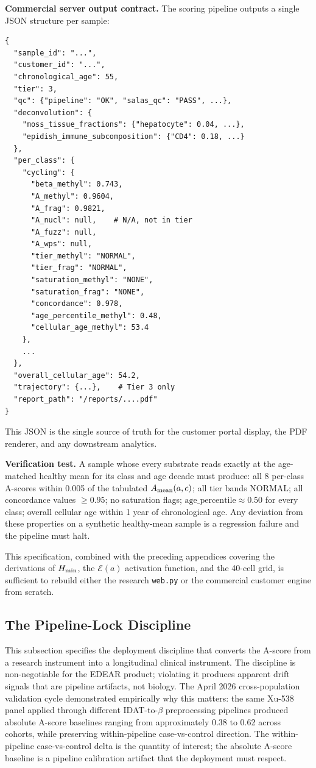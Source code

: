 \documentclass[12pt,a4paper]{article}
\begin{document}
\textbf{Commercial server output contract.} The scoring pipeline
outputs a single JSON structure per sample:

\begin{verbatim}
{
  "sample_id": "...",
  "customer_id": "...",
  "chronological_age": 55,
  "tier": 3,
  "qc": {"pipeline": "OK", "salas_qc": "PASS", ...},
  "deconvolution": {
    "moss_tissue_fractions": {"hepatocyte": 0.04, ...},
    "epidish_immune_subcomposition": {"CD4": 0.18, ...}
  },
  "per_class": {
    "cycling": {
      "beta_methyl": 0.743,
      "A_methyl": 0.9604,
      "A_frag": 0.9821,
      "A_nucl": null,    # N/A, not in tier
      "A_fuzz": null,
      "A_wps": null,
      "tier_methyl": "NORMAL",
      "tier_frag": "NORMAL",
      "saturation_methyl": "NONE",
      "saturation_frag": "NONE",
      "concordance": 0.978,
      "age_percentile_methyl": 0.48,
      "cellular_age_methyl": 53.4
    },
    ...
  },
  "overall_cellular_age": 54.2,
  "trajectory": {...},    # Tier 3 only
  "report_path": "/reports/....pdf"
}
\end{verbatim}

This JSON is the single source of truth for the customer portal
display, the PDF renderer, and any downstream analytics.

\textbf{Verification test.} A sample whose every substrate reads
exactly at the age-matched healthy mean for its class and age decade
must produce: all 8 per-class A-scores within 0.005 of the tabulated
$A_{\rm mean}(a,c)$; all tier bands NORMAL; all concordance values
$\geq 0.95$; no saturation flags; $\mathrm{age\_percentile} \approx 0.50$
for every class; overall cellular age within 1 year of chronological
age. Any deviation from these properties on a synthetic healthy-mean
sample is a regression failure and the pipeline must halt.

This specification, combined with the preceding appendices covering
the derivations of $H_{\rm min}$, the $\mathcal{E}(a)$ activation
function, and the 40-cell grid, is sufficient to rebuild either the
research \texttt{web.py} or the commercial customer engine from
scratch.

\subsection{The Pipeline-Lock Discipline}
\label{subsec:pipeline_lock}

This subsection specifies the deployment discipline that converts the
A-score from a research instrument into a longitudinal clinical
instrument. The discipline is non-negotiable for the EDEAR product;
violating it produces apparent drift signals that are pipeline
artifacts, not biology. The April 2026 cross-population validation
cycle demonstrated empirically why this matters: the same Xu-538 panel
applied through different IDAT-to-$\beta$ preprocessing pipelines
produced absolute A-score baselines ranging from approximately 0.38 to
0.62 across cohorts, while preserving within-pipeline case-vs-control
direction. The within-pipeline case-vs-control delta is the quantity
of interest; the absolute A-score baseline is a pipeline calibration
artifact that the deployment must respect.
\end{document}
